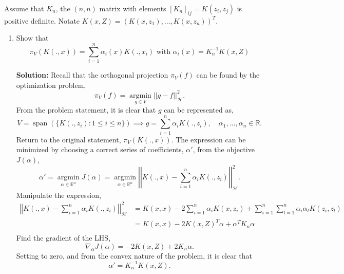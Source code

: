 \documentclass{article}[12pt]
\begin{document}
Assume that $K_n$, the $(n,n)$ matrix with elements $[K_n]_{ij}=K(z_i,z_j)$ is positive definite. Notate $K(x,Z)=(K(x,z_1),\ldots,K(x,z_n))^T$. 
\begin{enumerate}
\item Show that 
\begin{equation}
	\pi_V (K(.,x)) = \sum_{i=1}^n \alpha_i(x)K(.,x_i) \mbox{ with } \alpha_i(x)=K_n^{-1}K(x,Z)
\end{equation}

\textbf{Solution:} Recall that the orthogonal projection $\pi_V(f)$ can be found by the optimization problem,
\begin{equation}
	\pi_V(f) = \operatorname*{argmin}_{g \in V} || g - f ||_{\mathcal H}^2.
\end{equation}
From the problem statement, it is clear that $g$ can be represented as,
\begin{equation}
	V = \operatorname{span}(\{K(.,z_i): 1 \le i \le n\}) \implies g = \sum^{n}_{i=1} \alpha_i K(., z_i), \quad \alpha_1,...,\alpha_n \in \mathbb R. 
\end{equation}
Return to the original statement, $\pi_V(K(.,x))$. The expression can be minimized by choosing a correct series of coefficients, $\alpha'$, from the objective $J(\alpha)$,
\begin{equation}
	\alpha' = \operatorname*{argmin}_{\alpha \in \mathbb R^n} J(\alpha) = \operatorname*{argmin}_{\alpha \in \mathbb R^n} \left|\left|K(., x) - \sum^{n}_{i=1} \alpha_i K(., z_i) \right|\right|_{\mathcal H}^2.
\end{equation}
Manipulate the expression,
\begin{equation}
	\begin{aligned}
		\left|\left|K(., x) - \sum^{n}_{i=1} \alpha_i K(., z_i) \right|\right|_{\mathcal H}^2 &= K(x,x) - 2 \sum^{n}_{i=1} \alpha_i K(x, z_i) + \sum^{n}_{i=1} \sum^{n}_{l=1} \alpha_i \alpha_l K(z_i, z_l)\\
												      &= K(x,x) - 2 K(x, Z)^T \alpha + \alpha^T K_n \alpha \\ 
	\end{aligned}
\end{equation}
Find the gradient of the LHS,
\begin{equation}
	\nabla_\alpha J(\alpha) = -2 K(x, Z) + 2 K_n \alpha. 
\end{equation}
Setting to zero, and from the convex nature of the problem, it is clear that 
\begin{equation} \label{eq:alpha_opt}
	\alpha' = K_n^{-1} K(x, Z).
\end{equation}


\end{enumerate}
\end{document}
